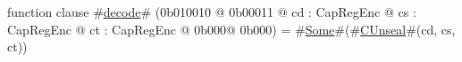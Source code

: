 function clause #\hyperref[sailMIPSzdecode]{decode}# (0b010010 @ 0b00011 @ cd : CapRegEnc @ cs : CapRegEnc @ ct : CapRegEnc @ 0b000@ 0b000) = #\hyperref[sailMIPSzSome]{Some}#(#\hyperref[sailMIPSzCUnseal]{CUnseal}#(cd, cs, ct))
